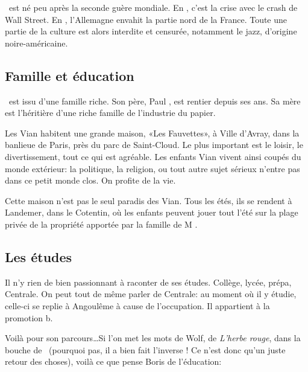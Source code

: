 \BV\ est né peu après la seconde guère mondiale. En , c'est
la crise avec le crash de Wall Street. En , l'Allemagne envahit la
partie nord de la France. Toute une partie de la culture est alors
interdite et censurée, notamment le jazz, d'origine noire-américaine.

\subsection{Famille et éducation}

\BV \ est issu d'une famille riche. Son père, Paul , est rentier
depuis ses  ans. Sa mère est l'héritière d'une riche famille de l'industrie
du papier.

Les Vian habitent une grande maison, «Les Fauvettes», à Ville d'Avray, dans la
banlieue de Paris, près du parc de Saint-Cloud. Le plus important est le loisir,
le divertissement, tout ce qui est agréable. Les enfants Vian vivent ainsi coupés
du monde extérieur: la politique, la religion, ou tout autre sujet sérieux n'entre
pas dans ce petit monde clos. On profite de la vie.

Cette maison n'est pas le seul paradis des Vian. Tous les étés, ils se rendent
à Landemer, dans le Cotentin, où les enfants peuvent jouer tout l'été sur la
plage privée de la propriété apportée par la famille de  M . 

\subsection{Les études}
Il n'y rien de bien passionnant à raconter de ses études. Collège, lycée, prépa, Centrale.
On peut tout de même parler de Centrale: au moment où il y étudie, celle-ci
se replie à Angoulême à cause de l'occupation. Il appartient à la promotion b.

Voilà pour son parcours\ldots Si l'on met les mots de Wolf, de \emph{L'herbe rouge},
dans la bouche de \BV\ (pourquoi pas, il a bien fait l'inverse ! Ce n'est donc qu'un
juste retour des choses), voilà ce que pense Boris de l'éducation:

